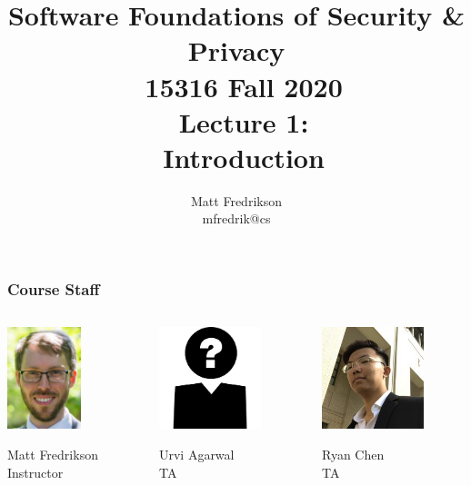 \documentclass[10pt]{beamer}
\title[Software Foundations of S \& P]{
\RaggedRight
	Software Foundations of Security \& Privacy \\
	\ 15316 Fall 2020 \\
	\ Lecture 1: \\
	\ Introduction
}
\author[Matt Fredrikson]{
	Matt Fredrikson \\
	mfredrik@cs
}
\begin{document}
\setlength\abovedisplayskip{5pt}
\setlength\belowdisplayskip{5pt}


\begin{frame}
\titlepage
\end{frame}


\begin{frame}

\frametitle{Course Staff}

\begin{columns}

\begin{column}{0.32\textwidth}
\centering
\includegraphics[height=8em]{matt.jpg}

Matt Fredrikson \\
Instructor
\end{column}

\begin{column}{0.32\textwidth}
\centering
\includegraphics[height=8em]{avatar.jpg}

Urvi Agarwal \\
TA
\end{column}

\begin{column}{0.32\textwidth}
\centering
\includegraphics[height=8em]{ryan.jpg}

Ryan Chen \\
TA
\end{column}

\end{columns}

\end{frame}
\end{document}
